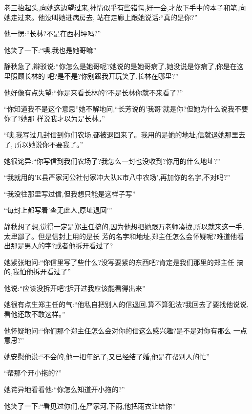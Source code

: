 ﻿\documentclass[12pt]{article}
\begin{document}
老三抬起头,向她这边望过来,神情似乎有些错愕,好一会,才放下手中的本子和笔,向她走过来。他没叫她进病房去,
站在走廊上跟她说话:``真的是\myrule 你?''

他一愣:``长林?不是在西村坪吗?''

他笑了一下:``噢,我也是她哥嘛\myrule ''

静秋急了,辩驳说:``你\myrule 怎么是她哥呢?她说的是她哥病了\myrule ,她没说是你病了,你是在这里照顾长林的
吧?是不是?你别跟我开玩笑了\myrule ,长林在哪里?''

他好像有点失望:``你\myrule 是来看长林的?不是长林\myrule 你就不来看了?''

``你知道我不是这个意思\myrule ''她不解地问,``长芳说的'我哥'就是你?但她为什么说我\myrule 不要你了?她那
样说\myrule 我才以为是\myrule 长林。''



``噢,我\myrule 写过几封信到你们农场,都被\myrule 退回来了。我用的是她的地址,信就\myrule 退她那里去了,
所以她说你\myrule 不要我了。''

她很诧异:``你写信到我们农场了?我怎么一封也没收到?你用的什么地址?''

``我就用的'K县严家河公社付家冲大队K市八中农场',再加你的名字,不对吗?''

``我没往那里写过信,但我想只能是这样子写\myrule ''

``每封上都写着'查无此人,原址退回'\myrule ''

静秋想了想,觉得一定是郑主任搞的,因为他想把她跟万老师凑拢,所以就来这一手,太卑鄙了。但是信封上用的是长
芳的名字和地址,郑主任怎么会怀疑呢?难道他看出那是男人的字?或者他拆开看过了?

她紧张地问:``你\myrule 信里写了些\myrule 什么?没\myrule 写\myrule 要紧的东西吧?肯定是我们那里的郑主任
搞的,我怕他\myrule 拆开看过了\myrule ''

他说:``应该没拆开吧?拆开过我应该能看得出来\myrule ''

她很有点生郑主任的气:``他私自把别人的信退回,算不算犯法?我回去了要找他说说,看他还敢不敢这样。''

他怀疑地问:``你们那个\myrule 郑主任\myrule 怎么会对你的信这么感兴趣?是不是\myrule 对你有\myrule 那么
一点意思?''

她安慰他说:``不会的,他一把年纪了,又已经结了婚,他是在帮别人的忙\myrule ''

``帮那个开\myrule 小拖的?''

她诧异地看看他:``你怎么知道\myrule 开小拖的?''

他笑了一下:``看见过你们\myrule ,在严家河,下雨\myrule ,他把雨衣\myrule 让给你\myrule ''
\end{document}

